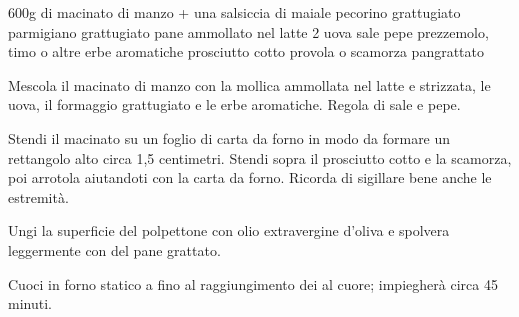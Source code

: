 \begin{ingreds}
	600g di macinato di manzo + una salsiccia di maiale
	pecorino grattugiato
	parmigiano grattugiato
	pane ammollato nel latte
	2 uova
	sale
	pepe
	prezzemolo, timo o altre erbe aromatiche
	prosciutto cotto
	provola o scamorza
	pangrattato
\end{ingreds}

\begin{method}
Mescola il macinato di manzo con la mollica ammollata nel latte e strizzata, le uova, il formaggio grattugiato e le erbe aromatiche. Regola di sale e pepe.

Stendi il macinato su un foglio di carta da forno in modo da formare un rettangolo alto circa 1,5 centimetri. Stendi sopra il prosciutto cotto e la scamorza, poi arrotola aiutandoti con la carta da forno. Ricorda di sigillare bene anche le estremità.

Ungi la superficie del polpettone con olio extravergine d'oliva e spolvera leggermente con del pane grattato.

Cuoci in forno statico a  fino al raggiungimento dei  al cuore; impiegherà circa 45 minuti.
\end {method}


